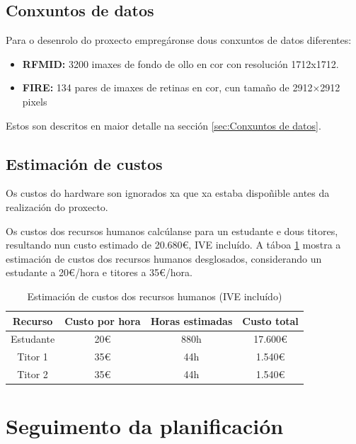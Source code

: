 \subsection{Conxuntos de datos}
\label{subsec:Conxuntos de datos}
Para o desenrolo do proxecto empregáronse dous conxuntos de datos diferentes:

\begin{itemize}
    \item \textbf{RFMID:} 3200 imaxes de fondo de ollo en cor con resolución 1712x1712.
    \item \textbf{FIRE:} 134 pares de imaxes de retinas en cor, cun tamaño de 2912×2912 pixels
\end{itemize}

Estos son descritos en maior detalle na sección \ref{sec:Conxuntos de datos}.

\subsection{Estimación de custos}
\label{subsec:Estimación de custos}

Os custos do hardware son ignorados xa que xa estaba dispoñible antes da realización do proxecto.

Os custos dos recursos humanos calcúlanse para un estudante e dous titores, resultando nun custo estimado de 20.680€, IVE incluído. A táboa \ref{tab:estimacion_custos} mostra a estimación de custos dos recursos humanos desglosados, considerando un estudante a 20€/hora e titores a 35€/hora.

\begin{table}[h]
\centering
\begin{tabular}{|c|c|c|c|}
\hline
\textbf{Recurso} & \textbf{Custo por hora} & \textbf{Horas estimadas} & \textbf{Custo total} \\ \hline
Estudante & 20€ & 880h & 17.600€ \\ \hline
Titor 1 & 35€ & 44h & 1.540€ \\ \hline
Titor 2 & 35€ & 44h & 1.540€ \\ \hline
\end{tabular}
\caption{Estimación de custos dos recursos humanos (IVE incluído)}
\label{tab:estimacion_custos}
\end{table}

\section{Seguimento da planificación}
\label{sec:Seguimento da planificación}

